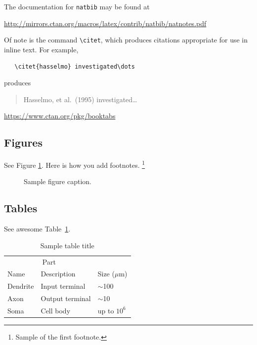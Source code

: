 \documentclass{article}
\begin{document}
The documentation for \verb+natbib+ may be found at
\begin{center}
  \url{http://mirrors.ctan.org/macros/latex/contrib/natbib/natnotes.pdf}
\end{center}
Of note is the command \verb+\citet+, which produces citations
appropriate for use in inline text.  For example,
\begin{verbatim}
   \citet{hasselmo} investigated\dots
\end{verbatim}
produces
\begin{quote}
  Hasselmo, et al.\ (1995) investigated\dots
\end{quote}

\begin{center}
  \url{https://www.ctan.org/pkg/booktabs}
\end{center}


\subsection{Figures}
\lipsum[10] 
See Figure \ref{fig:fig1}. Here is how you add footnotes. \footnote{Sample of the first footnote.}
\lipsum[11] 

\begin{figure}
  \centering
  \fbox{\rule[-.5cm]{4cm}{4cm} \rule[-.5cm]{4cm}{0cm}}
  \caption{Sample figure caption.}
  \label{fig:fig1}
\end{figure}

\subsection{Tables}
\lipsum[12]
See awesome Table~\ref{tab:table}.

\begin{table}
 \caption{Sample table title}
  \centering
  \begin{tabular}{lll}
    \toprule
    \multicolumn{2}{c}{Part}                   \\
    \cmidrule(r){1-2}
    Name     & Description     & Size ($\mu$m) \\
    \midrule
    Dendrite & Input terminal  & $\sim$100     \\
    Axon     & Output terminal & $\sim$10      \\
    Soma     & Cell body       & up to $10^6$  \\
    \bottomrule
  \end{tabular}
  \label{tab:table}
\end{table}
\end{document}
